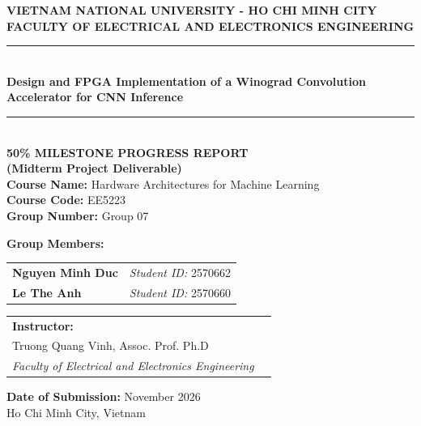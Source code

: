 \documentclass[12pt,a4paper]{article}
\begin{document}
\begin{titlepage}
    \centering
    \vspace*{0.5cm}

    {\Large \textbf{VIETNAM NATIONAL UNIVERSITY - HO CHI MINH CITY}}\\[0.2cm]
    {\large \textbf{FACULTY OF ELECTRICAL AND ELECTRONICS ENGINEERING}}\\[1.5cm]

    \rule{\linewidth}{1.5pt}\\[0.5cm]
    {\huge \bfseries Design and FPGA Implementation of a Winograd Convolution Accelerator for CNN Inference}\\[0.4cm]
    \rule{\linewidth}{1.5pt}\\[1.0cm]

    \textbf{\LARGE 50\% MILESTONE PROGRESS REPORT}\\[0.2cm]
    \textbf{\Large (Midterm Project Deliverable)}\\[0.6cm]
    {\large \textbf{Course Name:} Hardware Architectures for Machine Learning}\\[0.15cm]
    {\large \textbf{Course Code:} EE5223}\\[0.15cm]
    {\large \textbf{Group Number:} Group 07}\\[1.5cm]

    \begin{minipage}[t]{0.48\textwidth}
        \textbf{\large Group Members:}\\[0.3cm]
        \begin{tabular}{ll}
            \textbf{Nguyen Minh Duc} & \textit{Student ID:} 2570662 \\
            \textbf{Le The Anh}      & \textit{Student ID:} 2570660 \\
        \end{tabular}
    \end{minipage}
    \vfill
    \begin{minipage}[t]{0.48\textwidth}
        \begin{tabular}{ll}
            \textbf{\large Instructor:}                 \\[0.3cm]
            \large Truong Quang Vinh, Assoc. Prof. Ph.D \\[0.15cm]
            \textit{Faculty of Electrical and Electronics Engineering}
        \end{tabular}
    \end{minipage}

    \vfill
    {\large \textbf{Date of Submission:} November 2026}\\[0.3cm]
    {\large Ho Chi Minh City, Vietnam}
\end{titlepage}
\end{document}
